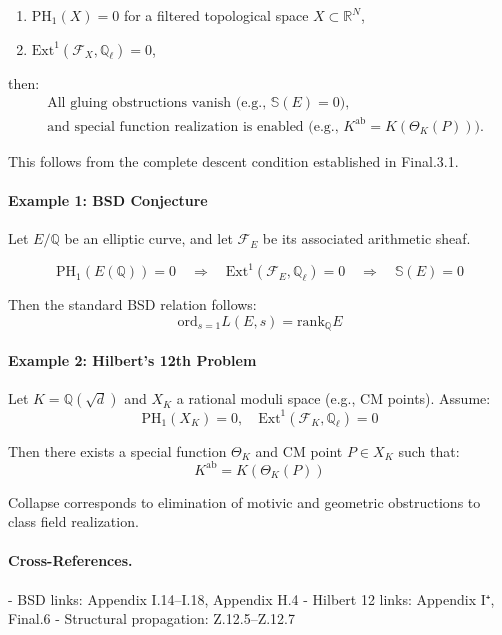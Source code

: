 \documentclass[11pt]{article}
\newcommand{\Sha}{\mathbb{S}}
\begin{document}
\begin{axiom}
\begin{axiom}
{{\begin{enumerate}
  \item \( \mathrm{PH}_1(X) = 0 \) for a filtered topological space \( X \subset \mathbb{R}^N \),
  \item \( \mathrm{Ext}^1(\mathcal{F}_X, \mathbb{Q}_\ell) = 0 \),
\end{enumerate}

then:
\[
\begin{aligned}
& \text{All gluing obstructions vanish (e.g., } \Sha(E) = 0 \text{),} \\
& \text{and special function realization is enabled (e.g., } 
K^{\mathrm{ab}} = K(\Theta_K(P)) \text{).}
\end{aligned}
\]

This follows from the complete descent condition established in Final.3.1.

\paragraph{Example 1: BSD Conjecture}
Let \( E/\mathbb{Q} \) be an elliptic curve, and let \( \mathcal{F}_E \) be its associated arithmetic sheaf.

\[
\mathrm{PH}_1(E(\mathbb{Q})) = 0 \quad \Rightarrow \quad \mathrm{Ext}^1(\mathcal{F}_E, \mathbb{Q}_\ell) = 0
\quad \Rightarrow \quad \Sha(E) = 0
\]

Then the standard BSD relation follows:
\[
\boxed{
\mathrm{ord}_{s=1} L(E,s) = \mathrm{rank}_{\mathbb{Q}} E
}
\]

\paragraph{Example 2: Hilbert’s 12th Problem}
Let \( K = \mathbb{Q}(\sqrt{d}) \) and \( X_K \) a rational moduli space (e.g., CM points). Assume:
\[
\mathrm{PH}_1(X_K) = 0, \quad \mathrm{Ext}^1(\mathcal{F}_K, \mathbb{Q}_\ell) = 0
\]

Then there exists a special function \( \Theta_K \) and CM point \( P \in X_K \) such that:
\[
K^{\mathrm{ab}} = K(\Theta_K(P))
\]

Collapse corresponds to elimination of motivic and geometric obstructions to class field realization.

\paragraph{Cross-References.}
- BSD links: Appendix I.14–I.18, Appendix H.4  
- Hilbert 12 links: Appendix I⁺, Final.6  
- Structural propagation: Z.12.5–Z.12.7

}}
\end{axiom}
\end{axiom}
\end{document}
